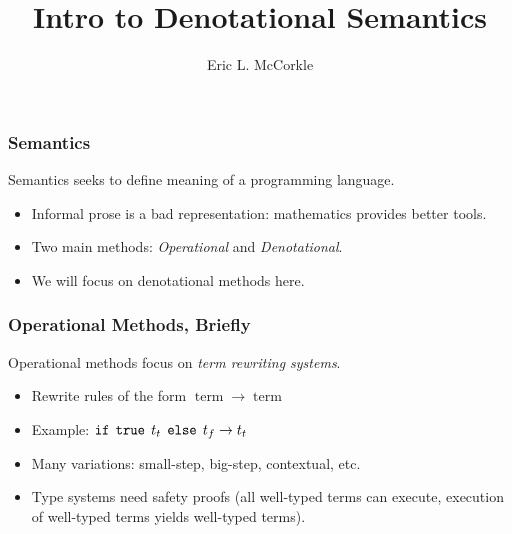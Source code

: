 \documentclass{beamer}
\title{Intro to Denotational Semantics}
\author{Eric L. McCorkle}
\begin{document}
\begin{frame}
  \titlepage
\end{frame}

\begin{frame}
  \frametitle{Semantics}
  Semantics seeks to define meaning of a programming language.
  \begin{itemize}
    \item Informal prose is a bad representation: mathematics provides
      better tools.
    \item Two main methods: \emph{Operational} and \emph{Denotational}.
    \item We will focus on denotational methods here.
  \end{itemize}
\end{frame}

\begin{frame}
  \frametitle{Operational Methods, Briefly}
  Operational methods focus on \emph{term rewriting systems}.
  \begin{itemize}
    \item Rewrite rules of the form $\operatorname{term} \rightarrow
      \operatorname{term}$
    \item Example: $\operatorname{\tt if}\;\operatorname{\tt
      true}\;t_t\;\operatorname{\tt else}\;t_f \rightarrow t_t$
    \item Many variations: small-step, big-step, contextual, etc.
    \item Type systems need safety proofs (all well-typed terms can
      execute, execution of well-typed terms yields well-typed terms).
  \end{itemize}
\end{frame}
\end{document}
